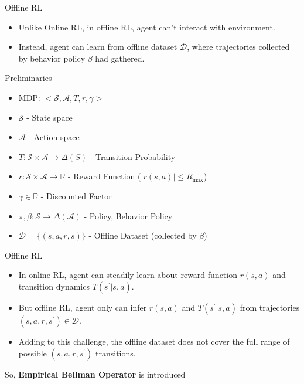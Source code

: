 \documentclass[11pt]{beamer}
\newcommand{\mbb}[1]{\mathbb{#1}}
\newcommand{\mc}[1]{\mathcal{#1}}
\newcommand{\abs}[1]{\left\lvert #1 \right\rvert}
\begin{document}
\begin{frame}{Offline RL}
  \begin{itemize}
    \item Unlike Online RL, in offline RL, agent can't interact with environment.
    \item Instead, agent can learn from offline dataset $\mc{D}$, where trajectories collected by behavior policy $\beta$ had gathered.
  \end{itemize}

  Preliminaries
  \begin{itemize}
    \item MDP: $<\mc{S}, \mc{A},T, r, \gamma>$
    \item $\mc{S}$ - State space
    \item $\mc{A}$ - Action space
    \item $T: \mc{S}\times \mc{A} \to \Delta(S)$ - Transition Probability
    \item $r: \mc{S} \times \mc{A} \to \mbb{R}$ - Reward Function ($\abs{r(s,a)} \leq R_{\text{max}}$)
    \item $\gamma \in \mbb{R}$ - Discounted Factor
    \item $\pi, \beta : \mc{S} \to \Delta(\mc{A})$ - Policy, Behavior Policy
    \item $\mc{D} = \{(s,a,r,s)\}$ - Offline Dataset (collected by $\beta$)
  \end{itemize}
\end{frame}

\begin{frame}{Offline RL}
  \begin{itemize}
    \item In online RL, agent can steadily learn about reward function $r(s,a)$ and transition dynamics $T(s^\prime | s,a)$.
    \item But offline RL, agent only can infer $r(s,a)$ and $T(s^\prime |s,a)$ from trajectories $(s,a,r,s^\prime) \in \mc{D}$.
    \item Adding to this challenge, the offline dataset does not cover the full range of possible $(s,a,r,s^\prime)$ transitions.
  \end{itemize}
  So, \textbf{Empirical Bellman Operator} is introduced
\end{frame}
\end{document}
